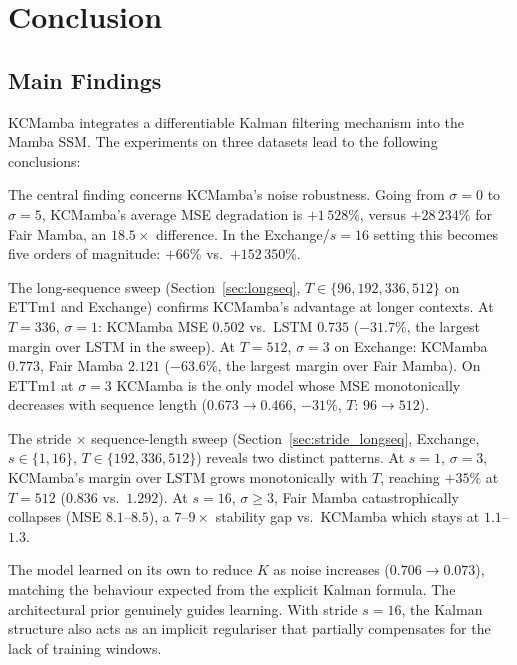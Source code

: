 \chapter{Conclusion}
\label{ch:osszegzes}

\section{Main Findings}

KCMamba integrates a differentiable Kalman filtering mechanism into the Mamba
SSM. The experiments on three datasets lead to the following conclusions:

The central finding concerns KCMamba's noise robustness.
Going from $\sigma=0$ to $\sigma=5$, KCMamba's average MSE degradation
is $+1\,528\%$, versus $+28\,234\%$ for Fair Mamba, an $18.5\times$
difference. In the Exchange/$s=16$ setting this becomes five orders of
magnitude: $+66\%$ vs.\ $+152\,350\%$.

The long-sequence sweep (Section~\ref{sec:longseq},
$T \in \{96,192,336,512\}$ on ETTm1 and Exchange) confirms KCMamba's
advantage at longer contexts. At $T{=}336$, $\sigma{=}1$: KCMamba MSE
$0.502$ vs.\ LSTM $0.735$ ($\mathbf{-31.7\%}$, the largest margin over
LSTM in the sweep). At $T{=}512$, $\sigma{=}3$ on Exchange: KCMamba
$0.773$, Fair Mamba $2.121$ ($\mathbf{-63.6\%}$, the largest margin over
Fair Mamba). On ETTm1 at $\sigma{=}3$ KCMamba is the only model whose
MSE monotonically decreases with sequence length
($0.673 \to 0.466$, $-31\%$, $T{:}\,96 \to 512$).

The stride $\times$ sequence-length sweep
(Section~\ref{sec:stride_longseq}, Exchange, $s \in \{1,16\}$,
$T \in \{192,336,512\}$) reveals two distinct patterns.
At $s{=}1$, $\sigma{=}3$, KCMamba's margin over LSTM grows monotonically
with $T$, reaching $+35\%$ at $T{=}512$ ($0.836$ vs.\ $1.292$).
At $s{=}16$, $\sigma{\geq}3$, Fair Mamba catastrophically collapses
(MSE $8.1$--$8.5$), a $7$--$9\times$ stability gap vs.\ KCMamba which
stays at $1.1$--$1.3$.

The model learned on its own to reduce $K$ as noise increases
($0.706 \to 0.073$), matching the behaviour expected from the explicit
Kalman formula. The architectural prior genuinely guides learning.
With stride $s=16$, the Kalman structure also acts as an implicit
regulariser that partially compensates for the lack of training windows.

